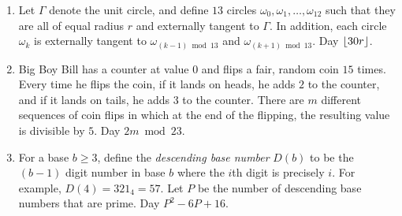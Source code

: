 \begin{enumerate}
    \item Let \( \Gamma \) denote the unit circle, and define \( 13 \) circles
        \( \omega_0,\omega_1,\ldots,\omega_{12} \) such that they are all of
        equal radius \( r \) and externally tangent to \( \Gamma \).  In addition, each circle \(
        \omega_k \) is externally tangent to \( \omega_{(k - 1) \bmod{13}} \) and \( \omega_{(k
        + 1) \bmod{13}} \). Day \( \left\lfloor 30r \right\rfloor \).

    \item Big Boy Bill has a counter at value \( 0 \) and flips a fair, random
        coin \( 15 \) times. Every time he flips the coin, if it lands on
        heads, he adds \( 2 \) to the counter, and if it lands on tails, he
        adds \( 3 \) to the counter. There are \( m \) different sequences of
        coin flips in which at the end of the flipping, the resulting value is
        divisible by \( 5 \). Day \( 2m \bmod{23} \).

    \item For a base \( b \ge 3 \), define the \textit{descending base number}
        \( D \left( b \right) \) to be the \( \left( b - 1 \right) \) digit
        number in base \( b \) where the \( i \)th digit is precisely \( i \).
        For example, \( D \left( 4 \right) = 321_4 = 57 \). Let \( P \) be the
        number of descending base numbers that are prime. Day \( P^2 - 6P + 16
        \).
\end{enumerate}

